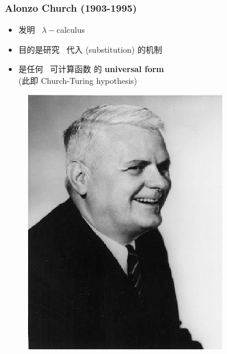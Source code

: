 \documentclass[17pt]{beamer}
\begin{document}
\begin{frame}
\frametitle{Alonzo Church (1903-1995)}
\fontsize{16}{16}\selectfont
\begin{minipage}[t]{0.55\linewidth}
	\begin{itemize}
		\item 发明 {\color{red} \ $\lambda-$calculus}
		\item 目的是研究 {\color{red} \ 代入} (substitution) 的机制
		\item 是任何 {\color{red} \ 可计算函数} 的 \textbf{universal form}\\
		(此即 Church-Turing hypothesis)
	\end{itemize}
\end{minipage}
\hfill
\begin{minipage}[t]{0.4\linewidth}
	\begin{figure}[H]
		\includegraphics[scale=0.4]{Church.jpg}
	\end{figure}
\end{minipage}
\end{frame}
\end{document}
